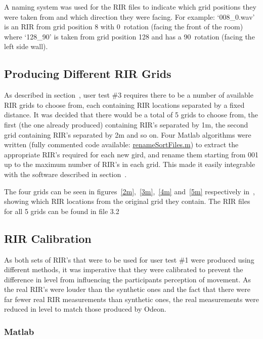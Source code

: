 \documentclass[../../main.tex]{subfiles}
\begin{document}
			A naming system was used for the \ac{RIR} files to indicate which grid positions they were taken from and which direction they were facing. For example: `008\_0.wav' is an \ac{RIR} from grid position 8 with 0\textdegree~rotation (facing the front of the room) where `128\_90' is taken from grid position 128 and has a 90\textdegree~rotation (facing the left side wall).

	\subsection{Producing Different RIR Grids}
	\label{odeon:grids}
		As described in section~, user test \#3 requires there to be a number of available \ac{RIR} grids to choose from, each containing \ac{RIR} locations separated by a fixed distance. It was decided that there would be a total of 5 grids to choose from, the first (the one already produced) containing \ac{RIR}'s separated by 1m, the second grid containing \ac{RIR}'s separated by 2m and so on.	 Four Matlab algorithms were written (fully commented code available: \href{http://lt669.github.io/code/matlab/html/renameSortFiles.html}{renameSortFiles.m}) to extract the appropriate \ac{RIR}'s required for each new gird, and rename them starting from 001 up to the maximum number of \ac{RIR}'s in each grid. This made it easily integrable with the software described in section~.

		The four grids can be seen in figures~\ref{2m},~\ref{3m},~\ref{4m} and~\ref{5m} respectively in~, showing which \ac{RIR} locations from the original grid they contain. The \ac{RIR} files for all 5 grids can be found in file 3.2


	\subsection{RIR Calibration}
		
		As both sets of \ac{RIR}'s that were to be used for user test \#1 were produced using different methods, it was imperative that they were calibrated to prevent the difference in level from influencing the participants perception of movement. As the real \ac{RIR}'s were louder than the synthetic ones and the fact that there were far fewer real \ac{RIR} measurements than synthetic ones, the real measurements were reduced in level to match those produced by Odeon.

		\subsubsection{Matlab}
\end{document}
